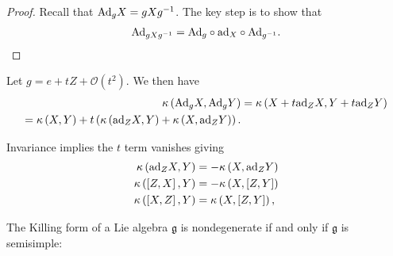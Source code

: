 \begin{proof}
    Recall that $\text{Ad}_{g} X = g X g^{-1}$. The key step is to show that
    \begin{align}
        \text{Ad}_{g X g^{-1}} = \text{Ad}_{g} \circ \text{ad}_{X} \circ \text{Ad}_{g^{-1}}
    .\end{align}
\end{proof}

Let $g = e + t Z + \mathcal{O}\left( t^2 \right) $. We then have
\begin{align}
    \kappa \left( \text{Ad}_g X, \text{Ad}_g Y \right) &= \kappa \left( X + t \text{ad}_Z X, Y + t \text{ad}_Z Y \right)  \\
    =\kappa \left( X,Y \right) + t \left( \kappa \left( \text{ad}_Z X, Y \right) + \kappa \left( X, \text{ad}_Z Y \right)  \right) 
.\end{align}

Invariance implies the $t$ term vanishes giving
\begin{align}
    \kappa \left( \text{ad}_Z X, Y \right)  &= -\kappa \left( X,\text{ad}_Z Y \right) \\
    \kappa \left( \left[ Z,X \right], Y  \right)  &= - \kappa \left( X, \left[ Z, Y \right]  \right)  \\
    \kappa \left( \left[ X,Z \right], Y  \right)  &=  \kappa \left( X, \left[ Z, Y \right]  \right) 
,\end{align}

\begin{theorem}[ (Cartan)]
    The Killing form of a Lie algebra $\mathfrak{g}$ is nondegenerate if and only if $\mathfrak{g}$ is semisimple:
\end{theorem}

